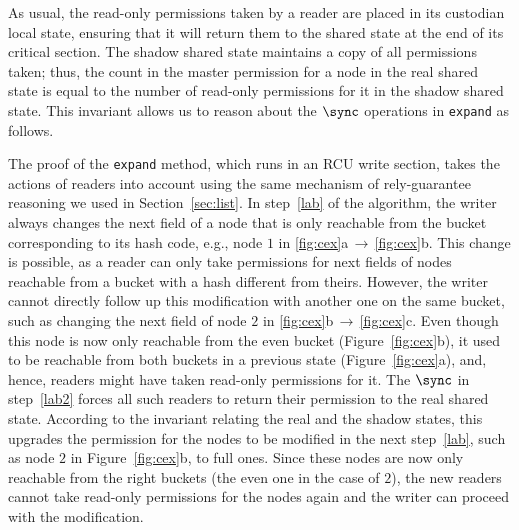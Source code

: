 As usual, the read-only permissions taken by a reader are placed in its
custodian local state, ensuring that it will return them to the shared state at
the end of its critical section. The shadow shared state maintains a copy of all
permissions taken; thus, the count in the master permission for a node in the
real shared state is equal to the number of read-only permissions for it in the
shadow shared state. This invariant allows us to reason about the $\sync$
operations in {\tt expand} as follows.

The proof of the {\tt expand} method, which runs in an RCU write section, takes
the actions of readers into account using the same mechanism of rely-guarantee
reasoning we used in Section~\ref{sec:list}. In step~\ref{lab} of the algorithm,
the writer always changes the next field of a node that is only reachable from
the bucket corresponding to its hash code, e.g., node $1$ in
\ref{fig:cex}a$\,\rightarrow\,$\ref{fig:cex}b. This change is possible, as a reader can
only take permissions for next fields of nodes reachable from a bucket with a
hash different from theirs. However, the writer cannot directly follow up this
modification with another one on the same bucket, such as changing the next
field of node $2$ in \ref{fig:cex}b$\,\rightarrow\,$\ref{fig:cex}c. Even though
this node is now only reachable from the even bucket (Figure~\ref{fig:cex}b), it
used to be reachable from both buckets in a previous state (Figure~\ref{fig:cex}a),
and, hence, readers might have taken read-only permissions for it. The $\sync$
in step~\ref{lab2} forces all such readers to return their permission to the
real shared state. According to the invariant relating the real and the shadow
states, this upgrades the permission for the nodes to be modified in the next
step~\ref{lab}, such as node $2$ in Figure~\ref{fig:cex}b, to full ones.  Since
these nodes are now only reachable from the right buckets (the even one in the
case of $2$), the new readers cannot take read-only permissions for the
nodes again and the writer can proceed with the modification.


